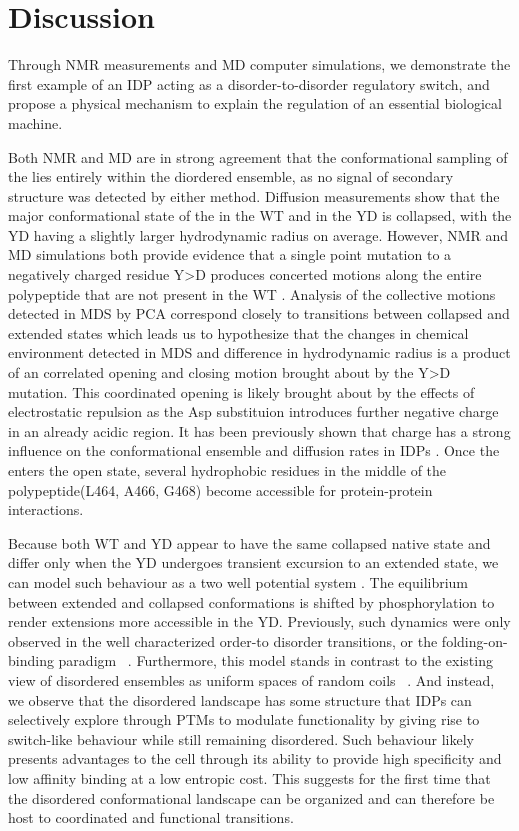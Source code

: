 \section{Discussion}

Through NMR measurements and MD computer simulations, we demonstrate the first example of an IDP acting as a disorder-to-disorder regulatory switch, and propose a physical mechanism to explain the regulation of an essential biological machine. 

Both NMR and MD are in strong agreement that the conformational sampling of the \gct lies entirely within the diordered ensemble, as no signal of secondary structure was detected by either method. Diffusion measurements show that the major conformational state of the \gct in the WT and in the YD is collapsed, with the YD having a slightly larger hydrodynamic radius on average. However, NMR and MD simulations both provide evidence that a single point mutation to a negatively charged residue Y>D produces concerted motions along the entire polypeptide that are not present in the WT \gct. Analysis of the collective motions detected in MDS by PCA correspond closely to transitions between collapsed and extended states which leads us to hypothesize that the changes in chemical environment detected in MDS and difference in hydrodynamic radius is a product of an correlated opening and closing motion brought about by the Y>D mutation. This coordinated opening is likely brought about by the effects of electrostatic repulsion as the Asp substituion introduces further negative charge in an already acidic region. It has been previously shown that charge has a strong influence on the conformational ensemble and diffusion rates in IDPs \cite{mao2010net}. Once the \gct enters the open state, several hydrophobic residues in the middle of the polypeptide(L464, A466, G468) become accessible for protein-protein interactions.

 Because both WT and YD appear to have the same collapsed native state and differ only when the YD undergoes transient excursion to an extended state, we can model such behaviour as a two well potential system . The equilibrium between extended and collapsed conformations is shifted by phosphorylation to render extensions more accessible in the YD.  Previously, such dynamics were only observed in the well characterized order-to disorder transitions, or the folding-on-binding paradigm ~\cite{tompa2012intrinsically}. Furthermore, this model stands in contrast to the existing view of disordered ensembles as uniform  spaces of random coils ~\cite{mittag2007atomic}. And instead, we observe that the disordered landscape has some structure that IDPs can selectively explore  through PTMs to modulate functionality by giving rise to switch-like behaviour while still remaining disordered. Such behaviour likely presents advantages to the cell through its ability to provide high specificity and low affinity binding at a low entropic cost. This suggests for the first time that the disordered conformational landscape can be organized and can therefore be host to coordinated and functional transitions.

